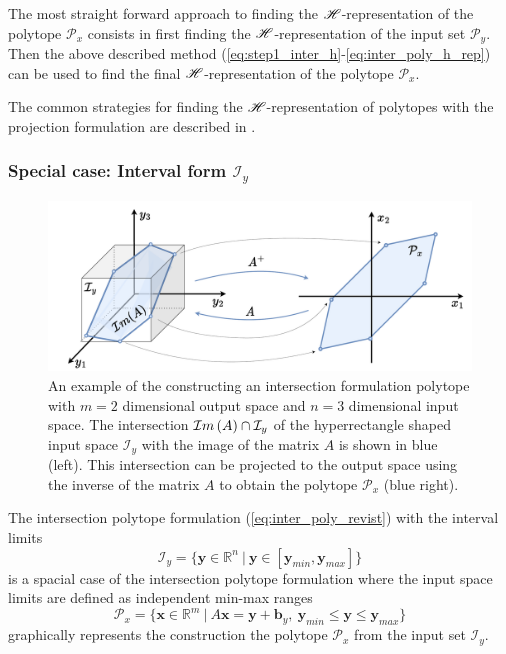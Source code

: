 The most straight forward approach to finding the $\mathscr{H}$-representation of the polytope $\mathcal{P}_x$ consists in first finding the $\mathscr{H}$-representation of the input set $\mathcal{P}_y$. Then the above described method  (\ref{eq:step1_inter_h}-\ref{eq:inter_poly_h_rep}) can be used to find the final $\mathscr{H}$-representation of the polytope $\mathcal{P}_x$.

The common strategies for finding the $\mathscr{H}$-representation of polytopes with the projection formulation are described in .

\subsubsection*{Special case: Interval form $\mathcal{I}_y$}  
\label{par:intersection_interval_algos_h}
\begin{figure}
    \centering
    \includegraphics[width=0.8\linewidth]{Chapters/imgs/intersection.pdf}
    \caption{An example of the constructing an intersection formulation polytope with $m=2$ dimensional output space and $n=3$ dimensional input space. The intersection $\mathcal{I}m\left(A\right) \cap \mathcal{I}_y$ of the hyperrectangle shaped input space $\mathcal{I}_y$ with the image of the matrix $A$ is shown in blue (left). This intersection can be projected to the output space using the inverse of the matrix $A$ to obtain the polytope $\mathcal{P}_x$ (blue right).}
    \label{fig:inter}
\end{figure}

The intersection polytope formulation (\ref{eq:inter_poly_revist}) with the interval limits 
\begin{equation}
    \mathcal{I}_y = \{ \bm{y}\in\mathbb{R}^n ~|~ \bm{y}\in[\bm{y}_{min},\bm{y}_{max}]\}
\end{equation}
is a spacial case of the intersection polytope formulation where the input space limits are defined as independent min-max ranges 
\begin{equation}
    \mathcal{P}_x=\{\bm{x}\in\mathbb{R}^m~ |~ A\bm{x} = \bm{y} + \bm{b}_y,~\bm{y}_{min} \leq  \bm{y} \leq \bm{y}_{max}  \}
    \label{eq:inter_hyp}
\end{equation}
 graphically represents the construction the polytope $\mathcal{P}_x$ from the input set $\mathcal{I}_y$.


